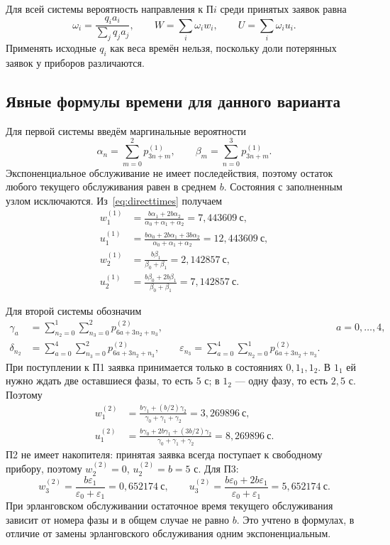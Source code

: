 \documentclass[a4paper,12pt]{article}
\begin{document}
Для всей системы вероятность направления к П$i$ среди принятых заявок равна
\[
\omega_i=\frac{q_i a_i}{\sum_j q_j a_j},\qquad
W=\sum_i\omega_iw_i,\qquad U=\sum_i\omega_iu_i.
\]
Применять исходные $q_i$ как веса времён нельзя, поскольку доли потерянных заявок у приборов различаются.

\subsection{Явные формулы времени для данного варианта}
Для первой системы введём маргинальные вероятности
\[
\alpha_n=\sum_{m=0}^2 p^{(1)}_{3n+m},\qquad
\beta_m=\sum_{n=0}^3 p^{(1)}_{3n+m}.
\]
Экспоненциальное обслуживание не имеет последействия, поэтому остаток любого текущего обслуживания равен в среднем $b$. Состояния с заполненным узлом исключаются. Из~\eqref{eq:directtimes} получаем
\begin{align}
w_1^{(1)}&=\frac{b\alpha_1+2b\alpha_2}{\alpha_0+\alpha_1+\alpha_2}
=7{,}443609\ \text{с},\\
u_1^{(1)}&=\frac{b\alpha_0+2b\alpha_1+3b\alpha_2}{\alpha_0+\alpha_1+\alpha_2}
=12{,}443609\ \text{с},\\
w_2^{(1)}&=\frac{b\beta_1}{\beta_0+\beta_1}=2{,}142857\ \text{с},\\
u_2^{(1)}&=\frac{b\beta_0+2b\beta_1}{\beta_0+\beta_1}=7{,}142857\ \text{с}.
\end{align}

Для второй системы обозначим
\[
\begin{aligned}
\gamma_a&=\sum_{n_2=0}^1\sum_{n_3=0}^2p^{(2)}_{6a+3n_2+n_3},&&a=0,\ldots,4,\\
\delta_{n_2}&=\sum_{a=0}^4\sum_{n_3=0}^2p^{(2)}_{6a+3n_2+n_3},\qquad
\varepsilon_{n_3}=\sum_{a=0}^4\sum_{n_2=0}^1p^{(2)}_{6a+3n_2+n_3}.
\end{aligned}
\]
При поступлении к П1 заявка принимается только в состояниях $0,1_1,1_2$. В $1_1$ ей нужно ждать две оставшиеся фазы, то есть $5$ с; в $1_2$ --- одну фазу, то есть $2{,}5$ с. Поэтому
\begin{align}
w_1^{(2)}&=\frac{b\gamma_1+(b/2)\gamma_2}{\gamma_0+\gamma_1+\gamma_2}
=3{,}269896\ \text{с},\\
u_1^{(2)}&=\frac{b\gamma_0+2b\gamma_1+(3b/2)\gamma_2}{\gamma_0+\gamma_1+\gamma_2}
=8{,}269896\ \text{с}.
\end{align}
П2 не имеет накопителя: принятая заявка всегда поступает к свободному прибору, поэтому $w_2^{(2)}=0$, $u_2^{(2)}=b=5$ с. Для П3:
\[
w_3^{(2)}=\frac{b\varepsilon_1}{\varepsilon_0+\varepsilon_1}=0{,}652174\ \text{с},\qquad
u_3^{(2)}=\frac{b\varepsilon_0+2b\varepsilon_1}{\varepsilon_0+\varepsilon_1}=5{,}652174\ \text{с}.
\]
При эрланговском обслуживании остаточное время текущего обслуживания зависит от номера фазы и в общем случае не равно $b$. Это учтено в формулах, в отличие от замены эрланговского обслуживания одним экспоненциальным.
\end{document}
